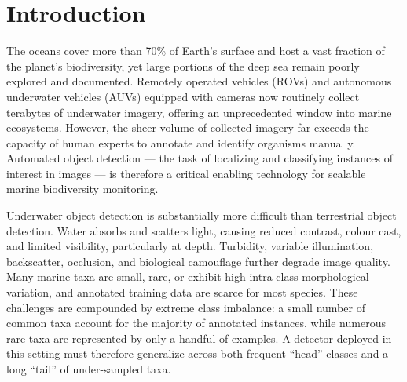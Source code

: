 \documentclass[11pt,a4paper]{article}
\begin{document}
\section{Introduction}
\label{sec:introduction}

The oceans cover more than 70\% of Earth's surface and host a vast fraction of the planet's biodiversity, yet large portions of the deep sea remain poorly explored and documented. Remotely operated vehicles (ROVs) and autonomous underwater vehicles (AUVs) equipped with cameras now routinely collect terabytes of underwater imagery, offering an unprecedented window into marine ecosystems. However, the sheer volume of collected imagery far exceeds the capacity of human experts to annotate and identify organisms manually. Automated object detection --- the task of localizing and classifying instances of interest in images --- is therefore a critical enabling technology for scalable marine biodiversity monitoring.

Underwater object detection is substantially more difficult than terrestrial object detection. Water absorbs and scatters light, causing reduced contrast, colour cast, and limited visibility, particularly at depth. Turbidity, variable illumination, backscatter, occlusion, and biological camouflage further degrade image quality. Many marine taxa are small, rare, or exhibit high intra-class morphological variation, and annotated training data are scarce for most species. These challenges are compounded by extreme class imbalance: a small number of common taxa account for the majority of annotated instances, while numerous rare taxa are represented by only a handful of examples. A detector deployed in this setting must therefore generalize across both frequent ``head'' classes and a long ``tail'' of under-sampled taxa.
\end{document}
